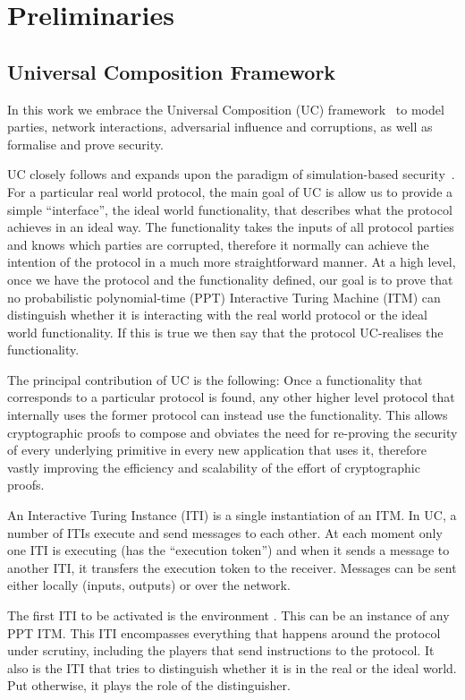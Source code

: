 \section{Preliminaries}
  \subsection{Universal Composition Framework}
  In this work we embrace the Universal Composition (UC) framework~\cite{uc} to
  model parties, network interactions, adversarial influence and corruptions, as
  well as formalise and prove security.

  UC closely follows and expands upon the paradigm of simulation-based
  security~\cite{DBLP:books/sp/17/Lindell17}. For a particular real world
  protocol, the main goal of UC is allow us to provide a simple ``interface'',
  the ideal world functionality, that describes what the protocol achieves in an
  ideal way. The functionality takes the inputs of all protocol parties and
  knows which parties are corrupted, therefore it normally can achieve the
  intention of the protocol in a much more straightforward manner. At a high
  level, once we have the protocol and the functionality defined, our goal is to
  prove that no probabilistic polynomial-time (PPT) Interactive Turing Machine
  (ITM) can distinguish whether it is interacting with the real world protocol
  or the ideal world functionality. If this is true we then say that the
  protocol UC-realises the functionality.

  The principal contribution of UC is the following: Once a functionality that
  corresponds to a particular protocol is found, any other higher level protocol
  that internally uses the former protocol can instead use the functionality.
  This allows cryptographic proofs to compose and obviates the need for
  re-proving the security of every underlying primitive in every new application
  that uses it, therefore vastly improving the efficiency and scalability of the
  effort of cryptographic proofs.

  An Interactive Turing Instance (ITI) is a single instantiation of an ITM. In
  UC, a number of ITIs execute and send
  messages to each other. At each moment only one ITI is executing (has the
  ``execution token'') and when it sends a message to another ITI, it transfers
  the execution token to the receiver. Messages can be sent either locally
  (inputs, outputs) or over the network.

  The first ITI to be activated is the environment \environment. This can be an
  instance of any
  PPT ITM. This ITI encompasses everything that happens around the protocol
  under scrutiny, including the players that send instructions to the protocol.
  It also is the ITI that tries to distinguish whether it is in the real or the
  ideal world. Put otherwise, it plays the role of the distinguisher.


